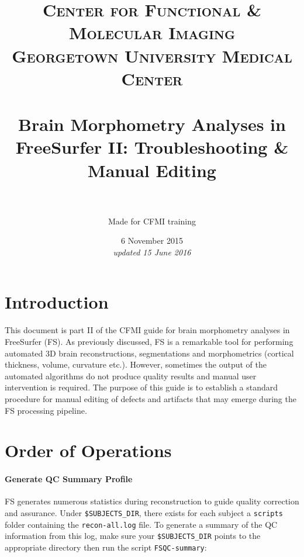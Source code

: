 \documentclass[paper=a4, fontsize=11pt]{scrartcl} %
\title{	
\normalfont \normalsize 
\textsc{Center for Functional \& Molecular Imaging \\ Georgetown University Medical Center} \\ [25pt] %
\horrule{0.5pt} \\[0.4cm] %
\huge Brain Morphometry Analyses in FreeSurfer II:  Troubleshooting \& Manual Editing  \\ %
\horrule{2pt} \\[0.5cm] %
}
\author{Made for CFMI training} %
\date{\normalsize 6 November 2015\\ \textit{updated 15 June 2016}} %
\numberwithin{equation}{section} %
\numberwithin{figure}{section} %
\numberwithin{table}{section} %
\begin{document}
\maketitle %

\lstset{escapechar=\@} %


\section{Introduction}  This document is part II of the CFMI guide for brain morphometry analyses in FreeSurfer (FS).  As previously discussed, FS is a remarkable tool for performing automated 3D brain  reconstructions, segmentations and morphometrics (cortical thickness, volume, curvature etc.).  However, sometimes the output of the automated algorithms do not produce quality results and manual user intervention is required.  The purpose of this guide is to establish a standard procedure for manual editing of defects and artifacts that may emerge during the FS processing pipeline.


\section{Order of Operations} 
\paragraph{Generate QC Summary Profile} FS generates numerous statistics during reconstruction to guide quality correction and assurance. Under \texttt{\$SUBJECTS\_DIR}, there exists for each subject a \texttt{scripts} folder containing the \texttt{recon-all.log} file.  To generate a summary of the QC information from this log, make sure your \texttt{\$SUBJECTS\_DIR} points to the appropriate directory then run the script \texttt{FSQC-summary}:
\end{document}
